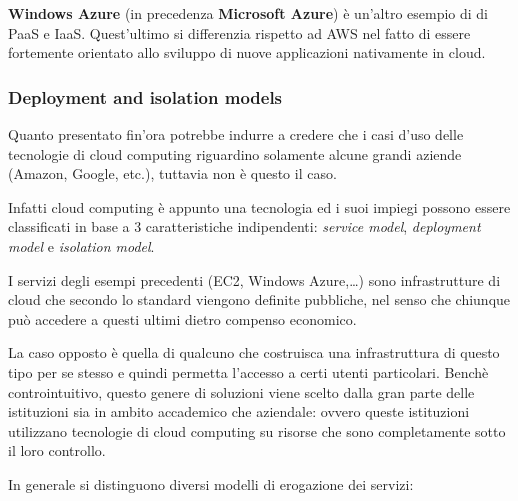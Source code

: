 \textbf{Windows Azure} (in precedenza \textbf{Microsoft Azure}) è
un'altro esempio di di PaaS e IaaS. Quest'ultimo si differenzia rispetto
ad AWS nel fatto di essere fortemente orientato allo sviluppo di nuove
applicazioni nativamente in cloud.

\subsubsection{Deployment and isolation
models}\label{deployment-and-isolation-models}

Quanto presentato fin'ora potrebbe indurre a credere che i casi d'uso
delle tecnologie di cloud computing riguardino solamente alcune grandi
aziende (Amazon, Google, etc.), tuttavia non è questo il caso.

Infatti cloud computing è appunto una tecnologia ed i suoi impiegi
possono essere classificati in base a 3 caratteristiche indipendenti:
\emph{service model}, \emph{deployment model} e \emph{isolation model}.

I servizi degli esempi precedenti (EC2, Windows Azure,\ldots{}) sono
infrastrutture di cloud che secondo lo standard viengono definite
pubbliche, nel senso che chiunque può accedere a questi ultimi dietro
compenso economico.

La caso opposto è quella di qualcuno che costruisca una infrastruttura
di questo tipo per se stesso e quindi permetta l'accesso a certi utenti
particolari. Benchè controintuitivo, questo genere di soluzioni viene
scelto dalla gran parte delle istituzioni sia in ambito accademico che
aziendale: ovvero queste istituzioni utilizzano tecnologie di cloud
computing su risorse che sono completamente sotto il loro controllo.

In generale si distinguono diversi modelli di erogazione dei servizi:

